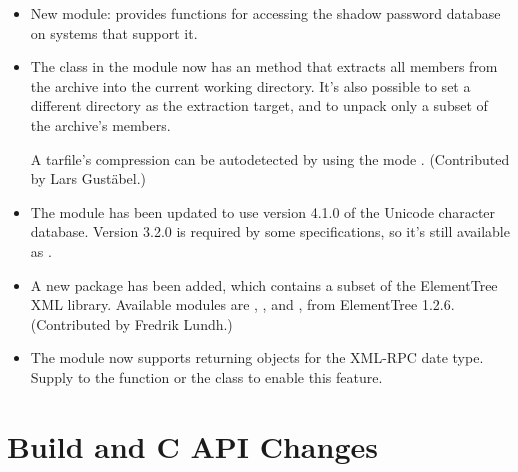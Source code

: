 \documentclass{howto}
\begin{document}
\begin{itemize}
\item New module:  provides functions for accessing the
shadow password database on systems that support it.  

\item The  class in the  module now has
an  method that extracts all members from the
archive into the current working directory.  It's also possible to set
a different directory as the extraction target, and to unpack only a
subset of the archive's members.  

A tarfile's compression can be autodetected by 
using the mode .
(Contributed by Lars Gust\"abel.)

\item The  module has been updated to use version 4.1.0
of the Unicode character database.  Version 3.2.0 is required 
by some specifications, so it's still available as 
.

\item A new package  has been added, which contains
a subset of the ElementTree XML library.  Available modules are
, , and
, from ElementTree 1.2.6. (Contributed by
Fredrik Lundh.)

\item The  module now supports returning 
       objects for the XML-RPC date type.  Supply 
       to the  function
      or the  class to enable this feature.


\end{itemize}








\section{Build and C API Changes}
\end{document}
